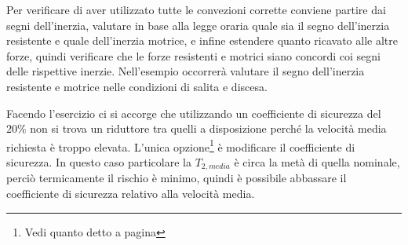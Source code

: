 Per verificare di aver utilizzato tutte le convezioni corrette conviene partire dai segni dell'inerzia, valutare in base alla legge oraria quale sia il segno dell'inerzia resistente e quale dell'inerzia motrice, e infine estendere quanto ricavato alle altre forze, quindi verificare che le forze resistenti e motrici siano concordi coi segni delle rispettive inerzie.
Nell'esempio occorrerà valutare il segno dell'inerzia resistente e motrice nelle condizioni di salita e discesa.

Facendo l'esercizio ci si accorge che utilizzando un coefficiente di sicurezza del $20\%$ non si trova un riduttore tra quelli a disposizione perché la velocità media richiesta è troppo elevata. L'unica opzione\footnote{Vedi quanto detto a pagina \pageref{rivalutazione_coeff_sic}} è modificare il coefficiente di sicurezza.
In questo caso particolare la $T_{2,media}$ è circa la metà di quella nominale, perciò termicamente il rischio è minimo, quindi è possibile abbassare il coefficiente di sicurezza relativo alla velocità media.